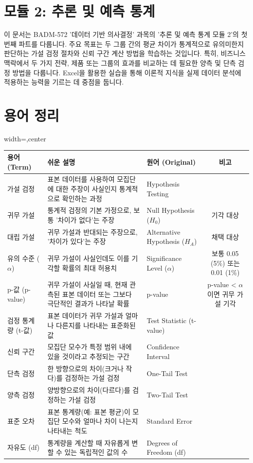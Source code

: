 \documentclass[11pt,a4paper]{article}
\begin{document}
\section*{\centering 모듈 2: 추론 및 예측 통계}

\begin{summarybox}[title=개요: 두 그룹 비교의 통계적 이해]
이 문서는 BADM-572 '데이터 기반 의사결정' 과목의 '추론 및 예측 통계 모듈 2'의 첫 번째 파트를 다룹니다.
주요 목표는 두 그룹 간의 평균 차이가 통계적으로 유의미한지 판단하는 가설 검정 절차와 신뢰 구간 계산 방법을 학습하는 것입니다.
특히, 비즈니스 맥락에서 두 가지 전략, 제품 또는 그룹의 효과를 비교하는 데 필요한 양측 및 단측 검정 방법을 다룹니다.
Excel을 활용한 실습을 통해 이론적 지식을 실제 데이터 분석에 적용하는 능력을 기르는 데 중점을 둡니다.
\end{summarybox}

\newpage
\section*{용어 정리}

\begin{adjustbox}{width=\textwidth,center}
\begin{tabular}{lllc}
\toprule
\textbf{용어 (Term)} & \textbf{쉬운 설명} & \textbf{원어 (Original)} & \textbf{비고} \\
\midrule
가설 검정 & 표본 데이터를 사용하여 모집단에 대한 주장이 사실인지 통계적으로 확인하는 과정 & Hypothesis Testing & \\
귀무 가설 & 통계적 검정의 기본 가정으로, 보통 '차이가 없다'는 주장 & Null Hypothesis ($H_0$) & 기각 대상 \\
대립 가설 & 귀무 가설과 반대되는 주장으로, '차이가 있다'는 주장 & Alternative Hypothesis ($H_A$) & 채택 대상 \\
유의 수준 ($\alpha$) & 귀무 가설이 사실인데도 이를 기각할 확률의 최대 허용치 & Significance Level ($\alpha$) & 보통 0.05 (5\%) 또는 0.01 (1\%) \\
p-값 (p-value) & 귀무 가설이 사실일 때, 현재 관측된 표본 데이터 또는 그보다 극단적인 결과가 나타날 확률 & p-value & p-value < $\alpha$ 이면 귀무 가설 기각 \\
검정 통계량 (t-값) & 표본 데이터가 귀무 가설과 얼마나 다른지를 나타내는 표준화된 값 & Test Statistic (t-value) & \\
신뢰 구간 & 모집단 모수가 특정 범위 내에 있을 것이라고 추정되는 구간 & Confidence Interval & \\
단측 검정 & 한 방향으로의 차이(크거나 작다)를 검정하는 가설 검정 & One-Tail Test & \\
양측 검정 & 양방향으로의 차이(다르다)를 검정하는 가설 검정 & Two-Tail Test & \\
표준 오차 & 표본 통계량(예: 표본 평균)이 모집단 모수와 얼마나 차이 나는지 나타내는 척도 & Standard Error & \\
자유도 (df) & 통계량을 계산할 때 자유롭게 변할 수 있는 독립적인 값의 수 & Degrees of Freedom (df) & \\
\bottomrule
\end{tabular}
\end{adjustbox}
\end{document}

